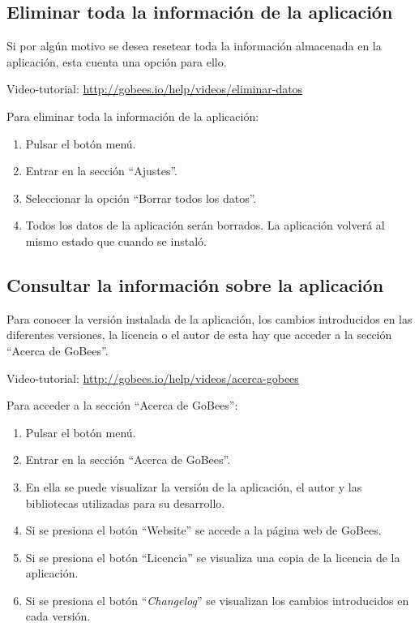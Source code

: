 \subsection{Eliminar toda la información de la
aplicación}\label{eliminar-toda-la-informaciuxf3n-de-la-aplicaciuxf3n}

Si por algún motivo se desea resetear toda la información almacenada en
la aplicación, esta cuenta una opción para ello.

Video-tutorial: \url{http://gobees.io/help/videos/eliminar-datos}

Para eliminar toda la información de la aplicación:

\begin{enumerate}
\def\labelenumi{\arabic{enumi}.}
\tightlist
\item
  Pulsar el botón menú.
\item
  Entrar en la sección ``Ajustes''.
\item
  Seleccionar la opción ``Borrar todos los datos''.
\item
  Todos los datos de la aplicación serán borrados. La aplicación volverá
  al mismo estado que cuando se instaló.
\end{enumerate}

\subsection{Consultar la información sobre la
aplicación}\label{consultar-la-informaciuxf3n-sobre-la-aplicaciuxf3n}

Para conocer la versión instalada de la aplicación, los cambios
introducidos en las diferentes versiones, la licencia o el autor de esta
hay que acceder a la sección ``Acerca de GoBees''.

Video-tutorial: \url{http://gobees.io/help/videos/acerca-gobees}

Para acceder a la sección ``Acerca de GoBees'':

\begin{enumerate}
\def\labelenumi{\arabic{enumi}.}
\tightlist
\item
  Pulsar el botón menú.
\item
  Entrar en la sección ``Acerca de GoBees''.
\item
  En ella se puede visualizar la versión de la aplicación, el autor y
  las bibliotecas utilizadas para su desarrollo.
\item
  Si se presiona el botón ``Website'' se accede a la página web de
  GoBees.
\item
  Si se presiona el botón ``Licencia'' se visualiza una copia de la
  licencia de la aplicación.
\item
  Si se presiona el botón ``\emph{Changelog}'' se visualizan los cambios
  introducidos en cada versión.
\end{enumerate}

